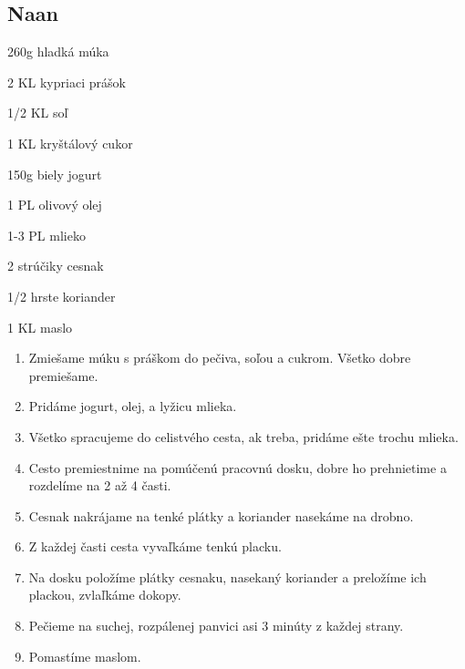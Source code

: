 \setcounter{step}{0}
\subsection{Naan}

\begin{ingredient}

\def\portions{2}%


\begin{main}
	\item 260g hladká múka
	\item 2 KL kypriaci prášok
	\item 1/2 KL soľ
	\item 1 KL kryštálový cukor
	\item 150g biely jogurt
	\item 1 PL olivový olej
	\item 1-3 PL mlieko 
	\item 2 strúčiky cesnak
	\item 1/2 hrste koriander
	\item 1 KL maslo
\end{main}
\end{ingredient}
\begin{recipe}

\begin{enumerate}
\item{Zmiešame múku s práškom do pečiva, soľou a cukrom. Všetko dobre premiešame.}
\item{Pridáme jogurt, olej, a lyžicu mlieka.}
\item{Všetko spracujeme do celistvého cesta, ak treba, pridáme ešte trochu mlieka.}
\item{Cesto premiestnime na pomúčenú pracovnú dosku, dobre ho prehnietime a rozdelíme na 2 až 4 časti.}
\item{Cesnak nakrájame na tenké plátky a koriander nasekáme na drobno.}
\item{Z každej časti cesta vyvaľkáme tenkú placku.}
\item{Na dosku položíme plátky cesnaku, nasekaný koriander a preložíme ich plackou, zvlaľkáme dokopy.}	
\item{Pečieme na suchej, rozpálenej panvici asi 3 minúty z každej strany.}
\item{Pomastíme maslom.}
\end{enumerate}

\end{recipe}

\begin{notes}

\end{notes}	
\clearpage
